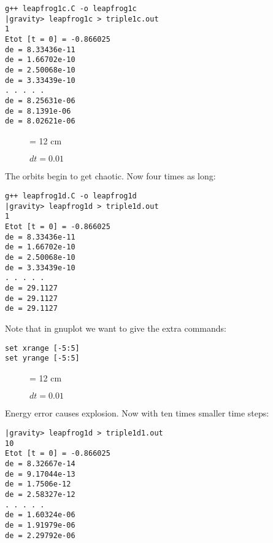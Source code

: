 \documentclass{book}
\def\code#1{{\small}}
\begin{document}
\begin{small}
\begin{verbatim}
g++ leapfrog1c.C -o leapfrog1c
|gravity> leapfrog1c > triple1c.out
1
Etot [t = 0] = -0.866025
de = 8.33436e-11
de = 1.66702e-10
de = 2.50068e-10
de = 3.33439e-10
. . . . .
de = 8.25631e-06
de = 8.1391e-06
de = 8.02621e-06
\end{verbatim}
\end{small}

\begin{figure}
\begin{center}
\leavevmode
\epsfxsize = 12 cm
\caption{$dt = 0.01$}
\label{fig:triple1c}
\end{center}
\end{figure}

The orbits begin to get chaotic.
Now four times as long:

\code{leapfrog1d.C}

\begin{small}
\begin{verbatim}
g++ leapfrog1d.C -o leapfrog1d
|gravity> leapfrog1d > triple1d.out
1
Etot [t = 0] = -0.866025
de = 8.33436e-11
de = 1.66702e-10
de = 2.50068e-10
de = 3.33439e-10
. . . . .
de = 29.1127
de = 29.1127
de = 29.1127
\end{verbatim}
\end{small}

Note that in gnuplot we want to give the extra commands:

\begin{small}
\begin{verbatim}
set xrange [-5:5]
set yrange [-5:5]
\end{verbatim}
\end{small}

\begin{figure}
\begin{center}
\leavevmode
\epsfxsize = 12 cm
\caption{$dt = 0.01$}
\label{fig:triple1d}
\end{center}
\end{figure}

Energy error causes explosion.
Now with ten times smaller time steps:

\begin{small}
\begin{verbatim}
|gravity> leapfrog1d > triple1d1.out
10
Etot [t = 0] = -0.866025
de = 8.32667e-14
de = 9.17044e-13
de = 1.7506e-12
de = 2.58327e-12
. . . . .
de = 1.60324e-06
de = 1.91979e-06
de = 2.29792e-06
\end{verbatim}
\end{small}
\end{document}

